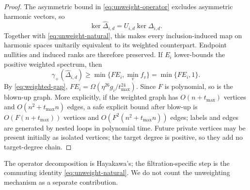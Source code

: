 \begin{proof}
The asymmetric bound in \cref{eq:unweight-operator} excludes asymmetric
harmonic vectors, so
\[
\ker\widehat\Delta_{i,d}=U_{i,d}\ker\Delta_{i,d}.
\]
Together with \cref{eq:unweight-natural}, this makes every inclusion-induced
map on harmonic spaces unitarily equivalent to its weighted counterpart.
Endpoint nullities and induced ranks are therefore preserved.  If \(E_i\)
lower-bounds the positive weighted spectrum, then
\[
\gamma_+(\widehat\Delta_{i,d})
\ge\min\{FE_i,\min_v f_v\}=\min\{FE_i,1\}.
\]
By \cref{eq:weighted-gap}, \(FE_i=
\Omega(\eta^{26}g_i/t_{\max}^{24})\).  Since \(F\) is polynomial, so is the
blown-up graph.  More explicitly, if the weighted graph has
\(O(n+t_{\max})\) vertices and \(O(n^2+t_{\max}n)\) edges, a safe explicit
bound after blow-up is \(O(F(n+t_{\max}))\) vertices and
\(O(F^2(n^2+t_{\max}n))\) edges; labels and edges are generated by nested
loops in polynomial time.  Future private vertices may be present initially as isolated
vertices; the target degree is positive, so they add no target-degree chain.
\end{proof}

The operator decomposition is Hayakawa's; the filtration-specific step is
the commuting identity \cref{eq:unweight-natural}.  We do not count the
unweighting mechanism as a separate contribution.
